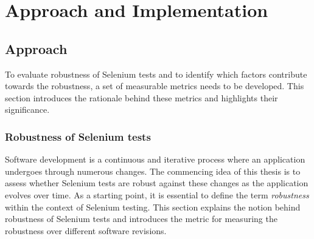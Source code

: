 \chapter{Approach and Implementation} %

\label{Chapter3} %

\section{Approach}
To evaluate robustness of Selenium tests and to identify which factors contribute towards the robustness, a set of measurable metrics needs to be developed. This section introduces the rationale behind these metrics and highlights their significance.

\subsection{Robustness of Selenium tests}
\label{robustnessOfSeleniumTests}
Software development is a continuous and iterative process where an application undergoes through numerous changes. The commencing idea of this thesis is to assess whether Selenium tests are robust against these changes as the application evolves over time. As a starting point, it is essential to define the term \textit{robustness} within the context of Selenium testing. This section explains the notion behind robustness of Selenium tests and introduces the metric for measuring the robustness over different software revisions.

